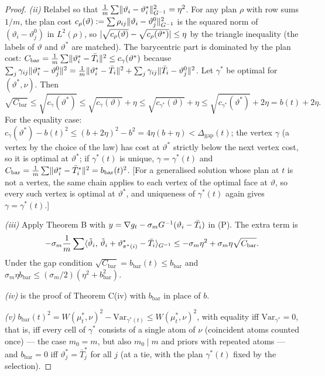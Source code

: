 \begin{proof}
\smallskip
\textit{(ii)} Relabel so that $\frac1m\sum\lVert \vartheta_i - \vartheta^*_i\rVert^2_{G^{-1}} = \eta^2$. For any plan $\rho$
with row sums $1/m$, the plan cost $c_\rho(\vartheta) := \sum\rho_{ij}\lVert \vartheta_i - \vartheta^0_j\rVert^2_{G^{-1}}$
is the squared norm of $(\vartheta_i - \vartheta^0_j)$ in $L^2(\rho)$, so
$\lvert \sqrt{c_\rho(\vartheta)} - \sqrt{c_\rho(\vartheta^*)}\rvert \le \eta$ by the triangle inequality (the labels of
$\vartheta$ and $\vartheta^*$ are matched). The barycentric part is dominated by the plan cost:
$C_{\mathrm{bar}} = \frac1m\sum\lVert \vartheta^*_i - \bar T_i\rVert^2 \le c_\gamma(\vartheta^*)$ because
$\sum_j\gamma_{ij}\lVert \vartheta^*_i - \vartheta^0_j\rVert^2 = \frac1m\lVert \vartheta^*_i - \bar T_i\rVert^2
+ \sum_j\gamma_{ij}\lVert \bar T_i - \vartheta^0_j\rVert^2$. Let $\gamma^*$ be optimal for $(\vartheta^*,\nu)$. Then
\[
  \sqrt{C_{\mathrm{bar}}} \le \sqrt{c_\gamma(\vartheta^*)} \le \sqrt{c_\gamma(\vartheta)} + \eta
  \le \sqrt{c_{\gamma^*}(\vartheta)} + \eta \le \sqrt{c_{\gamma^*}(\vartheta^*)} + 2\eta = b(t) + 2\eta.
\]
For the equality case: $c_\gamma(\vartheta^*) - b(t)^2 \le (b+2\eta)^2 - b^2 = 4\eta(b+\eta) < \Delta_{\mathrm{gap}}(t)$;
the vertex $\gamma$ (a vertex by the choice of the law) has cost at $\vartheta^*$ strictly below the next vertex cost,
so it is optimal at $\vartheta^*$; if $\gamma^*(t)$ is unique, $\gamma = \gamma^*(t)$ and
$C_{\mathrm{bar}} = \frac1m\sum\lVert \vartheta^*_i - \bar T^*_i\rVert^2 = b_{\mathrm{bar}}(t)^2$. [For a generalised
solution whose plan at $t$ is not a vertex, the same chain applies to each vertex of the optimal face at $\vartheta$,
so every such vertex is optimal at $\vartheta^*$, and uniqueness of $\gamma^*(t)$ again gives $\gamma = \gamma^*(t)$.]

\smallskip
\textit{(iii)} Apply Theorem B with $y = \nabla g_t - \sigma_mG^{-1}(\vartheta_i - \bar T_i)$ in (P). The extra term is
\[
  -\sigma_m\frac1m\sum\langle \tilde\vartheta_i,\, \tilde\vartheta_i + \vartheta^*_{\pi^*(i)} - \bar T_i\rangle_{G^{-1}}
  \le -\sigma_m\eta^2 + \sigma_m\eta\sqrt{C_{\mathrm{bar}}}.
\]
Under the gap condition $\sqrt{C_{\mathrm{bar}}} = b_{\mathrm{bar}}(t) \le b_{\mathrm{bar}}$ and
$\sigma_m\eta b_{\mathrm{bar}} \le (\sigma_m/2)(\eta^2 + b_{\mathrm{bar}}^2)$.

\smallskip
\textit{(iv)} is the proof of Theorem C(iv) with $b_{\mathrm{bar}}$ in place of $b$.

\smallskip
\textit{(v)} $b_{\mathrm{bar}}(t)^2 = W(\mu^*_t,\nu)^2 - \mathrm{Var}_{\gamma^*(t)} \le W(\mu^*_t,\nu)^2$, with
equality iff $\mathrm{Var}_{\gamma^*} = 0$, that is, iff every cell of $\gamma^*$ consists of a single atom of $\nu$
(coincident atoms counted once) --- the case $m_0 = m$, but also $m_0\mid m$ and priors with repeated atoms --- and
$b_{\mathrm{bar}} = 0$ iff $\vartheta^*_j = \bar T^*_j$ for all $j$ (at a tie, with the plan $\gamma^*(t)$ fixed by
the selection).
\end{proof}

